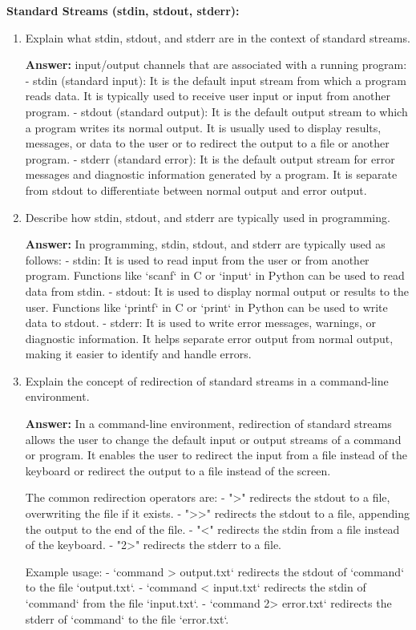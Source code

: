 \documentclass{article}
\begin{document}
\textbf{Standard Streams (stdin, stdout, stderr):}
\begin{enumerate}
    \item Explain what stdin, stdout, and stderr are in the context of standard streams.
    
    \textbf{Answer:}
    input/output channels that are associated with a running program:
    - stdin (standard input): It is the default input stream from which a program reads data. It is typically used to receive user input or input from another program.
    - stdout (standard output): It is the default output stream to which a program writes its normal output. It is usually used to display results, messages, or data to the user or to redirect the output to a file or another program.
    - stderr (standard error): It is the default output stream for error messages and diagnostic information generated by a program. It is separate from stdout to differentiate between normal output and error output.
    
    \item Describe how stdin, stdout, and stderr are typically used in programming.
    
    \textbf{Answer:}
    In programming, stdin, stdout, and stderr are typically used as follows:
    - stdin: It is used to read input from the user or from another program. Functions like `scanf` in C or `input` in Python can be used to read data from stdin.
    - stdout: It is used to display normal output or results to the user. Functions like `printf` in C or `print` in Python can be used to write data to stdout.
    - stderr: It is used to write error messages, warnings, or diagnostic information. It helps separate error output from normal output, making it easier to identify and handle errors.
    
    \item Explain the concept of redirection of standard streams in a command-line environment.
    
    \textbf{Answer:}
    In a command-line environment, redirection of standard streams allows the user to change the default input or output streams of a command or program. It enables the user to redirect the input from a file instead of the keyboard or redirect the output to a file instead of the screen.
    
    The common redirection operators are:
    - ">" redirects the stdout to a file, overwriting the file if it exists.
    - ">>" redirects the stdout to a file, appending the output to the end of the file.
    - "<" redirects the stdin from a file instead of the keyboard.
    - "2>" redirects the stderr to a file.
    
    Example usage:
    - `command > output.txt` redirects the stdout of `command` to the file `output.txt`.
    - `command < input.txt` redirects the stdin of `command` from the file `input.txt`.
    - `command 2> error.txt` redirects the stderr of `command` to the file `error.txt`.
    
\end{enumerate}
\end{document}

